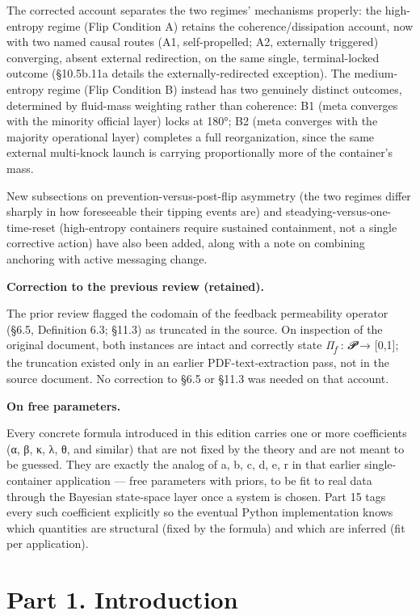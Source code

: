 \documentclass[
]{article}
\begin{document}
The corrected account separates the two regimes' mechanisms properly:
the high-entropy regime (Flip Condition A) retains the
coherence/dissipation account, now with two named causal routes (A1,
self-propelled; A2, externally triggered) converging, absent external
redirection, on the same single, terminal-locked outcome (§10.5b.11a
details the externally-redirected exception). The medium-entropy regime
(Flip Condition B) instead has two genuinely distinct outcomes,
determined by fluid-mass weighting rather than coherence: B1 (meta
converges with the minority official layer) locks at 180°; B2 (meta
converges with the majority operational layer) completes a full
reorganization, since the same external multi-knock launch is carrying
proportionally more of the container's mass.

New subsections on prevention-versus-post-flip asymmetry (the two
regimes differ sharply in how foreseeable their tipping events are) and
steadying-versus-one-time-reset (high-entropy containers require
sustained containment, not a single corrective action) have also been
added, along with a note on combining anchoring with active messaging
change.

\textbf{Correction to the previous review (retained).}

The prior review flagged the codomain of the feedback permeability
operator (§6.5, Definition 6.3; §11.3) as truncated in the source. On
inspection of the original document, both instances are intact and
correctly state \emph{Π\textsubscript{f}} : \emph{𝓟} → {[}0,1{]}; the
truncation existed only in an earlier PDF-text-extraction pass, not in
the source document. No correction to §6.5 or §11.3 was needed on that
account.

\textbf{On free parameters.}

Every concrete formula introduced in this edition carries one or more
coefficients (α, β, κ, λ, θ, and similar) that are not fixed by the
theory and are not meant to be guessed. They are exactly the analog of
a, b, c, d, e, r in that earlier single-container application --- free
parameters with priors, to be fit to real data through the Bayesian
state-space layer once a system is chosen. Part 15 tags every such
coefficient explicitly so the eventual Python implementation knows which
quantities are structural (fixed by the formula) and which are inferred
(fit per application).

\hypertarget{part-1.-introduction}{%
\section{Part 1. Introduction}\label{part-1.-introduction}}
\end{document}
